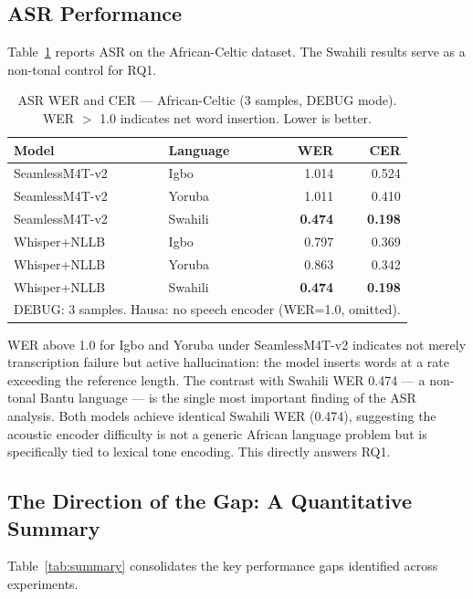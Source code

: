 \documentclass[10pt,twocolumn]{article}
\begin{document}
\subsection{ASR Performance}

Table~\ref{tab:asr} reports ASR on the African-Celtic dataset.
The Swahili results serve as a non-tonal control for RQ1.

\begin{table}[H]
\centering
\caption{ASR WER and CER --- African-Celtic (3 samples, DEBUG mode).
WER $>$ 1.0 indicates net word insertion. Lower is better.}
\label{tab:asr}
\small
\setlength{\tabcolsep}{3pt}
\begin{tabular}{llrr}
\toprule
\textbf{Model} & \textbf{Language} & \textbf{WER} & \textbf{CER} \\
\midrule
SeamlessM4T-v2 & Igbo    & 1.014 & 0.524 \\
SeamlessM4T-v2 & Yoruba  & 1.011 & 0.410 \\
SeamlessM4T-v2 & Swahili & \textbf{0.474} & \textbf{0.198} \\
\midrule
Whisper+NLLB   & Igbo    & 0.797 & 0.369 \\
Whisper+NLLB   & Yoruba  & 0.863 & 0.342 \\
Whisper+NLLB   & Swahili & \textbf{0.474} & \textbf{0.198} \\
\bottomrule
\multicolumn{4}{l}{\footnotesize DEBUG: 3 samples. Hausa: no speech encoder (WER=1.0, omitted).}
\end{tabular}
\end{table}

WER above 1.0 for Igbo and Yoruba under SeamlessM4T-v2 indicates
not merely transcription failure but active hallucination: the
model inserts words at a rate exceeding the reference length.
The contrast with Swahili WER 0.474 --- a non-tonal Bantu language
--- is the single most important finding of the ASR analysis.
Both models achieve identical Swahili WER (0.474), suggesting the
acoustic encoder difficulty is not a generic African language
problem but is specifically tied to lexical tone encoding.
This directly answers RQ1.

\subsection{The Direction of the Gap: A Quantitative Summary}

Table~\ref{tab:summary} consolidates the key performance gaps
identified across experiments.
\end{document}
